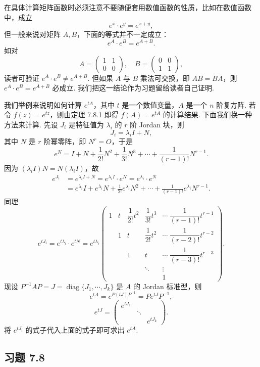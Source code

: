 \documentclass[UTF8, 12pt, fontset=fandol, oneside]{ctexart}
\begin{document}
在具体计算矩阵函数时必须注意不要随便套用数值函数的性质，比如在数值函数中，成立
\[
e^x\cdot e^y=e^{x+y},
\]
但一般来说对矩阵 $A,B$，下面的等式并不一定成立：
\[
e^A\cdot e^B=e^{A+B}.
\]
如对
\[
A=\left(\begin{array}{cc}
1 & 1\\
0 & 0
\end{array}\right),\quad
B=\left(\begin{array}{cc}
0 & 0\\
1 & 1
\end{array}\right),
\]
读者可验证 $e^A\cdot e^B\ne e^{A+B}$. 但如果 $A$ 与 $B$ 乘法可交换，即 $AB=BA$，则 $e^A\cdot e^B=e^{A+B}$ 必成立. 我们把这一结论作为习题留给读者自己证明.

我们举例来说明如何计算 $e^{tA}$，其中 $t$ 是一个数值变量，$A$ 是一个 $n$ 阶复方阵. 若令 $f(z)=e^{tz}$，则由定理 7.8.1 即得 $f(A)=e^{tA}$ 的计算结果. 下面我们换一种方法来计算. 先设 $J_i$ 是特征值为 $\lambda_i$ 的 $r$ 阶 Jordan 块，则
\[
J_i=\lambda_iI+N,
\]
其中 $N$ 是 $r$ 阶幂零阵，即 $N^r=O$，于是
\[
e^N=I+N+\frac1{2!}N^2+\frac1{3!}N^3+\cdots+\frac1{(r-1)!}N^{r-1}.
\]
因为 $(\lambda_iI)N=N(\lambda_iI)$，故
\[
\begin{aligned}
e^{J_i}&=e^{\lambda_iI+N}=e^{\lambda_iI}\cdot e^N=e^{\lambda_i}\cdot e^N\\
&=e^{\lambda_i}I+e^{\lambda_i}N+\frac1{2!}e^{\lambda_i}N^2+\cdots+\frac1{(r-1)!}e^{\lambda_i}N^{r-1}.
\end{aligned}
\]
同理
\[
e^{tJ_i}=e^{t\lambda_i}\cdot e^{tN}=e^{t\lambda_i}\left(\begin{array}{ccccc}
1 & t & \dfrac1{2!}t^2 & \dfrac1{3!}t^3 & \cdots\ \dfrac1{(r-1)!}t^{r-1}\\
& 1 & t & \dfrac1{2!}t^2 & \cdots\ \dfrac1{(r-2)!}t^{r-2}\\
& & 1 & t & \cdots\ \dfrac1{(r-3)!}t^{r-3}\\
& & & \ddots & \vdots\\
& & & & 1
\end{array}\right).
\]
现设 $P^{-1}AP=J=\operatorname{diag}\{J_1,\cdots,J_k\}$ 是 $A$ 的 Jordan 标准型，则
\[
e^{tA}=e^{P(tJ)P^{-1}}=Pe^{tJ}P^{-1},
\]
\[
e^{tJ}=\left(\begin{array}{ccc}
e^{tJ_1} & & \\
& \ddots & \\
& & e^{tJ_k}
\end{array}\right).
\]
将 $e^{tJ_i}$ 的式子代入上面的式子即可求出 $e^{tA}$.

\subsection*{习题 7.8}
\end{document}
